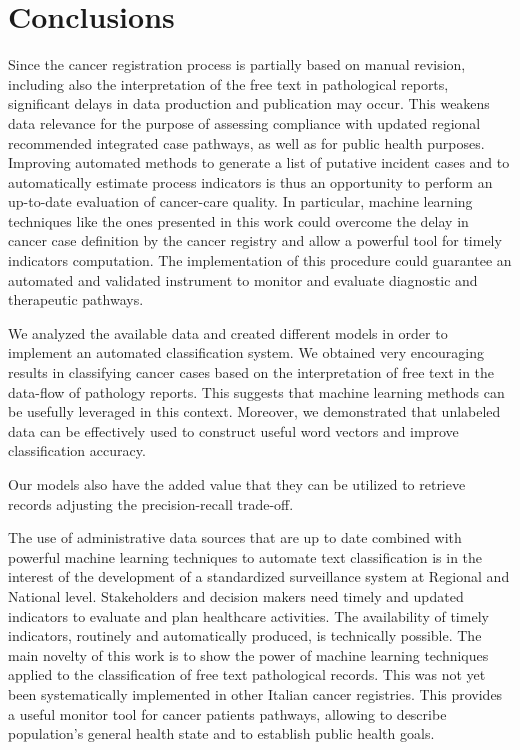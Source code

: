 \chapter{Conclusions}
Since the cancer registration process is partially based on manual
revision, including also the interpretation of the free text in
pathological reports, significant delays in data production and
publication may occur. This weakens data relevance for the purpose of
assessing compliance with updated regional recommended integrated case
pathways, as well as for public health purposes. Improving automated
methods to generate a list of putative incident cases and to
automatically estimate process indicators is thus an opportunity to
perform an up-to-date evaluation of cancer-care quality. In
particular, machine learning techniques like the ones presented in
this work could overcome the delay in cancer case definition by the
cancer registry and allow a powerful tool for timely indicators
computation. The implementation of this procedure could guarantee an
automated and validated instrument to monitor and evaluate diagnostic
and therapeutic pathways.

We analyzed the available data and created different models in order
to implement an automated classification system. We obtained very
encouraging results in classifying cancer cases based on the
interpretation of free text in the data-flow of pathology
reports. This suggests that machine learning methods can be usefully
leveraged in this context. Moreover, we demonstrated that unlabeled
data can 
be effectively used to construct useful word vectors and improve
classification accuracy. 

Our models also have the added value that they can be
utilized to retrieve records adjusting the precision-recall trade-off.

The use of administrative data sources that are up to date combined
with powerful machine learning techniques to automate text
classification is in the interest of the development of a standardized
surveillance system at Regional and National level. Stakeholders and
decision makers need timely and updated indicators to evaluate and
plan healthcare activities. The availability of timely indicators,
routinely and automatically produced, is technically possible. The
main novelty of this work is to show the power of machine learning
techniques applied to the classification of free text pathological
records. This was not yet been systematically implemented in other
Italian cancer registries. This provides a useful monitor tool for
cancer patients pathways, allowing to describe population’s general
health state and to establish public health goals.

